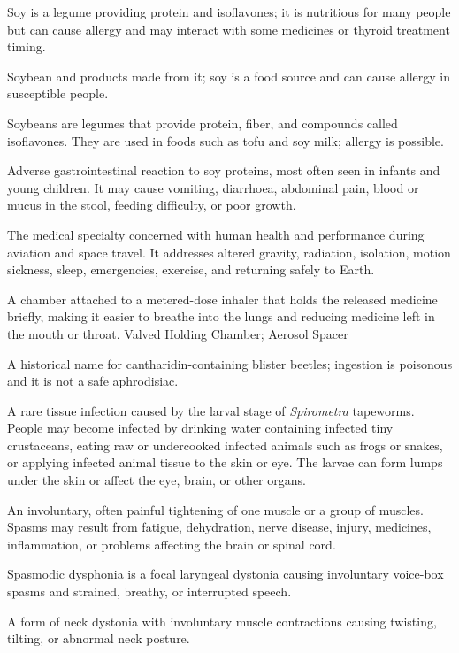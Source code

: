  Soy is a legume providing protein and isoflavones; it is nutritious for many people but can cause allergy and may interact with some medicines or thyroid treatment timing.

 Soybean and products made from it; soy is a food source and can cause allergy in susceptible people.

 Soybeans are legumes that provide protein, fiber, and compounds called isoflavones. They are used in foods such as tofu and soy milk; allergy is possible.

 Adverse gastrointestinal reaction to soy proteins, most often seen in infants and young
children. It may cause vomiting, diarrhoea, abdominal pain, blood or mucus in the stool,
feeding difficulty, or poor growth.

 The medical specialty concerned with human health and performance during aviation and space travel. It addresses altered gravity, radiation, isolation, motion sickness, sleep, emergencies, exercise, and returning safely to Earth.

 A chamber attached to a metered-dose inhaler that holds the released medicine briefly, making it easier to breathe into the lungs and reducing medicine left in the mouth or throat.
\synonyms
Valved Holding Chamber; Aerosol Spacer

 A historical name for cantharidin-containing blister beetles; ingestion is poisonous and it is not a safe aphrodisiac.

 A rare tissue infection caused by the larval stage of \textit{Spirometra} tapeworms. People may become infected by drinking water containing infected tiny crustaceans, eating raw or undercooked infected animals such as frogs or snakes, or applying infected animal tissue to the skin or eye. The larvae can form lumps under the skin or affect the eye, brain, or other organs.

 An involuntary, often painful tightening of one muscle or a group of muscles. Spasms may result from fatigue, dehydration, nerve disease, injury, medicines, inflammation, or problems affecting the brain or spinal cord.

 Spasmodic dysphonia is a focal laryngeal dystonia causing involuntary voice-box spasms and strained, breathy, or interrupted speech.

 A form of neck dystonia with involuntary muscle contractions causing twisting, tilting, or abnormal neck posture.

